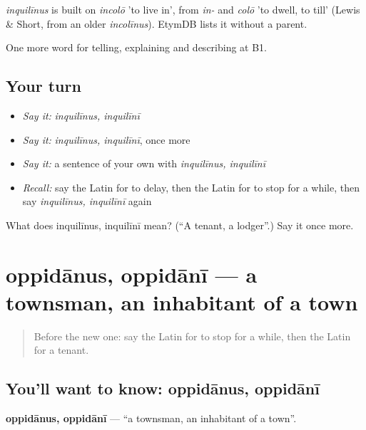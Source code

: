 \begin{cousinweb}
\emph{inquilīnus} is built on \emph{incolō} 'to live in', from \emph{in-} and \emph{colō} 'to dwell, to till' (Lewis \& Short, from an older \emph{incolīnus}). EtymDB lists it without a parent.
\end{cousinweb}

\begin{grammarlens}[title={What you've built}]
One more word for telling, explaining and describing at B1.
\end{grammarlens}

\subsection*{Your turn}
\begin{itemize}
\raggedright
  \item \emph{Say it:} \emph{inquilīnus, inquilīnī}
  \item \emph{Say it:} \emph{inquilīnus, inquilīnī}, once more
  \item \emph{Say it:} a sentence of your own with \emph{inquilīnus, inquilīnī}
  \item \emph{Recall:} say the Latin for to delay, then the Latin for to stop for a while, then say \emph{inquilīnus, inquilīnī} again
\end{itemize}

\begin{tcolorbox}[breakable,colback=teal!4,colframe=teal!35!black,title={Before you move on}]
What does inquilīnus, inquilīnī mean? (\textquotedblleft{}A tenant, a lodger\textquotedblright{}.) Say it once more.
\end{tcolorbox}
\section[oppidānus, oppidānī]{oppidānus, oppidānī — a townsman, an inhabitant of a town}

\label{lesson:LA-C456-oppidanus}



\begin{quote}
Before the new one: say the Latin for to stop for a while, then the Latin for a tenant.
\end{quote}

\subsection*{You'll want to know: oppidānus, oppidānī}
\textbf{oppidānus, oppidānī} — \textquotedblleft{}a townsman, an inhabitant of a town\textquotedblright{}.

